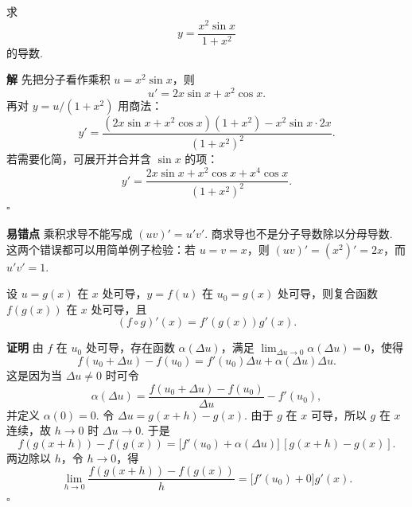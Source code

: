 \documentclass[fontset=fandol]{ctexart}
\newenvironment{proofdetail}{\par\noindent\textbf{证明}\quad}{\hfill$\square$\par\vspace{0.8em}}
\newenvironment{solution}{\par\noindent\textbf{解}\quad}{\hfill$\square$\par\vspace{0.8em}}
\newenvironment{warning}{\par\noindent\textbf{易错点}\quad}{\par\vspace{0.8em}}
\newcommand{\dd}{\mathrm{d}}
\begin{document}
\begin{example}[乘积与商的求导]
求
\[
y=\frac{x^2\sin x}{1+x^2}
\]
的导数.
\end{example}
\begin{solution}
先把分子看作乘积 $u=x^2\sin x$，则
\[
u'=2x\sin x+x^2\cos x.
\]
再对 $y=u/(1+x^2)$ 用商法：
\[
y'=\frac{(2x\sin x+x^2\cos x)(1+x^2)-x^2\sin x\cdot2x}{(1+x^2)^2}.
\]
若需要化简，可展开并合并含 $\sin x$ 的项：
\[
y'=\frac{2x\sin x+x^2\cos x+x^4\cos x}{(1+x^2)^2}.
\]
\end{solution}
\begin{warning}
乘积求导不能写成 $(uv)'=u'v'$. 商求导也不是分子导数除以分母导数. 这两个错误都可以用简单例子检验：若 $u=v=x$，则 $(uv)'=(x^2)'=2x$，而 $u'v'=1$.
\end{warning}

\begin{theorem}[复合函数求导法则]
设 $u=g(x)$ 在 $x$ 处可导，$y=f(u)$ 在 $u_0=g(x)$ 处可导，则复合函数 $f(g(x))$ 在 $x$ 处可导，且
\[
(f\circ g)'(x)=f'(g(x))g'(x).
\]
\end{theorem}
\begin{proofdetail}
由 $f$ 在 $u_0$ 处可导，存在函数 $\alpha(\Delta u)$，满足 $\lim_{\Delta u\to0}\alpha(\Delta u)=0$，使得
\[
f(u_0+\Delta u)-f(u_0)=f'(u_0)\Delta u+\alpha(\Delta u)\Delta u.
\]
这是因为当 $\Delta u\neq0$ 时可令
\[
\alpha(\Delta u)=\frac{f(u_0+\Delta u)-f(u_0)}{\Delta u}-f'(u_0),
\]
并定义 $\alpha(0)=0$. 令 $\Delta u=g(x+h)-g(x)$. 由于 $g$ 在 $x$ 可导，所以 $g$ 在 $x$ 连续，故 $h\to0$ 时 $\Delta u\to0$. 于是
\[
f(g(x+h))-f(g(x))
=\bigl[f'(u_0)+\alpha(\Delta u)\bigr]\,[g(x+h)-g(x)].
\]
两边除以 $h$，令 $h\to0$，得
\[
\lim_{h\to0}\frac{f(g(x+h))-f(g(x))}{h}
=\bigl[f'(u_0)+0\bigr]g'(x).
\]
\end{proofdetail}

\begin{center}
\end{center}
\end{document}
